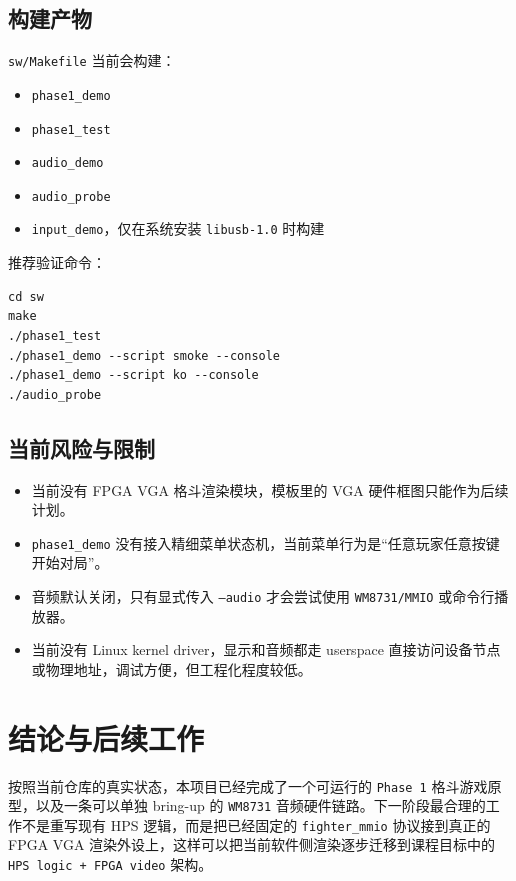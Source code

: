 \documentclass[12pt,a4paper]{ctexart}
\begin{document}
\subsection{构建产物}

\texttt{sw/Makefile} 当前会构建：

\begin{itemize}
  \item \texttt{phase1\_demo}
  \item \texttt{phase1\_test}
  \item \texttt{audio\_demo}
  \item \texttt{audio\_probe}
  \item \texttt{input\_demo}，仅在系统安装 \texttt{libusb-1.0} 时构建
\end{itemize}

推荐验证命令：

\begin{lstlisting}[style=fighterstyle]
cd sw
make
./phase1_test
./phase1_demo --script smoke --console
./phase1_demo --script ko --console
./audio_probe
\end{lstlisting}

\subsection{当前风险与限制}

\begin{itemize}
  \item 当前没有 FPGA VGA 格斗渲染模块，模板里的 VGA 硬件框图只能作为后续计划。
  \item \texttt{phase1\_demo} 没有接入精细菜单状态机，当前菜单行为是“任意玩家任意按键开始对局”。
  \item 音频默认关闭，只有显式传入 \texttt{--audio} 才会尝试使用 \texttt{WM8731/MMIO} 或命令行播放器。
  \item 当前没有 Linux kernel driver，显示和音频都走 userspace 直接访问设备节点或物理地址，调试方便，但工程化程度较低。
\end{itemize}

\section{结论与后续工作}

按照当前仓库的真实状态，本项目已经完成了一个可运行的 \texttt{Phase 1} 格斗游戏原型，以及一条可以单独 bring-up 的 \texttt{WM8731} 音频硬件链路。下一阶段最合理的工作不是重写现有 HPS 逻辑，而是把已经固定的 \texttt{fighter\_mmio} 协议接到真正的 FPGA VGA 渲染外设上，这样可以把当前软件侧渲染逐步迁移到课程目标中的 \texttt{HPS logic + FPGA video} 架构。
\end{document}
